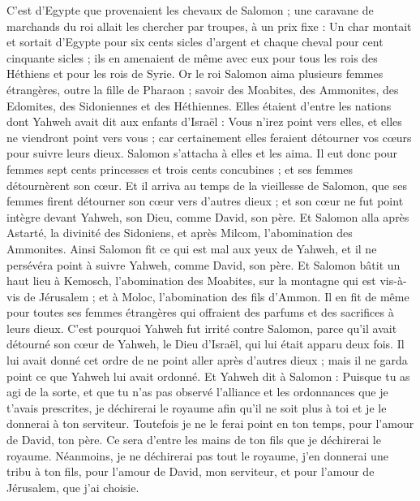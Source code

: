 \begin{multicols}{2}
C'est d'Egypte que provenaient les chevaux de Salomon ; une caravane de marchands du roi allait les chercher par troupes, à un prix fixe :
Un char montait et sortait d'Egypte pour six cents sicles d'argent et chaque cheval pour cent cinquante sicles ; ils en amenaient de même avec eux pour tous les rois des Héthiens et pour les rois de Syrie.
\VerseOne{}Or le roi Salomon aima plusieurs femmes étrangères, outre la fille de Pharaon ; savoir des Moabites, des Ammonites, des Edomites, des Sidoniennes et des Héthiennes.
Elles étaient d'entre les nations dont Yahweh avait dit aux enfants d'Israël : Vous n'irez point vers elles, et elles ne viendront point vers vous ; car certainement elles feraient détourner vos cœurs pour suivre leurs dieux. Salomon s'attacha à elles et les aima.
Il eut donc pour femmes sept cents princesses et trois cents concubines ; et ses femmes détournèrent son cœur.
Et il arriva au temps de la vieillesse de Salomon, que ses femmes firent détourner son cœur vers d'autres dieux ; et son cœur ne fut point intègre devant Yahweh, son Dieu, comme David, son père.
Et Salomon alla après Astarté, la divinité des Sidoniens, et après Milcom, l'abomination des Ammonites.
Ainsi Salomon fit ce qui est mal aux yeux de Yahweh, et il ne persévéra point à suivre Yahweh, comme David, son père.
Et Salomon bâtit un haut lieu à Kemosch, l'abomination des Moabites, sur la montagne qui est vis-à-vis de Jérusalem ; et à Moloc, l'abomination des fils d'Ammon.
Il en fit de même pour toutes ses femmes étrangères qui offraient des parfums et des sacrifices à leurs dieux.
C'est pourquoi Yahweh fut irrité contre Salomon, parce qu'il avait détourné son cœur de Yahweh, le Dieu d'Israël, qui lui était apparu deux fois.
Il lui avait donné cet ordre de ne point aller après d'autres dieux ; mais il ne garda point ce que Yahweh lui avait ordonné.
Et Yahweh dit à Salomon : Puisque tu as agi de la sorte, et que tu n'as pas observé l'alliance et les ordonnances que je t'avais prescrites, je déchirerai le royaume afin qu'il ne soit plus à toi et je le donnerai à ton serviteur.
Toutefois je ne le ferai point en ton temps, pour l'amour de David, ton père. Ce sera d'entre les mains de ton fils que je déchirerai le royaume.
Néanmoins, je ne déchirerai pas tout le royaume, j'en donnerai une tribu à ton fils, pour l'amour de David, mon serviteur, et pour l'amour de Jérusalem, que j'ai choisie.

\end{multicols}
